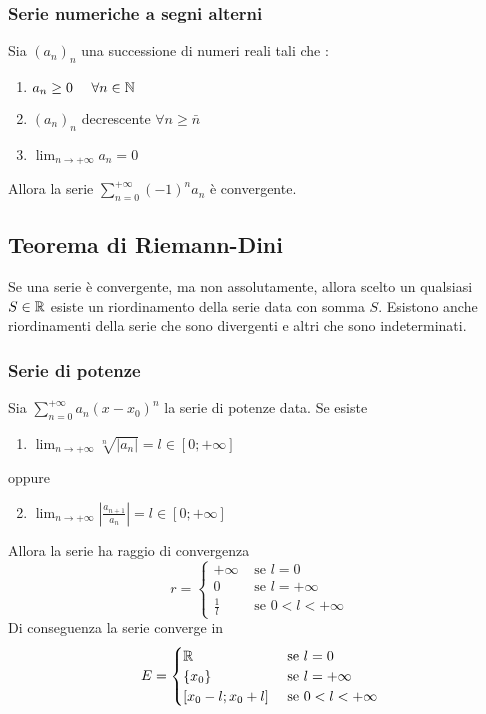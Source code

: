 \documentclass{article}
\newcommand{\se}{\text{ se }}
\begin{document}
\subsubsection*{Serie numeriche a segni alterni}
\begin{shadedTheorem}
    Sia $(a_n)_n$ una successione di numeri reali tali che :
    \begin{enumerate}[label=\roman*\:\textnormal{)},itemindent=*]
        \item $a_n\geq 0 ~~~~\forall n\in \mathbb{N}$
        \item $(a_n)_n$ decrescente $\forall n\geq\bar n$
        \item $\lim_{n\to +\infty} a_n=0$
    \end{enumerate}
    Allora la serie $\sum_{n=0}^{+\infty}(-1)^na_n$ è convergente.
\end{shadedTheorem}
\subsection*{Teorema di Riemann-Dini}
\begin{shadedTheorem}
    Se una serie è convergente, ma non assolutamente, allora scelto un qualsiasi $S\in \mathbb{R}$ esiste un riordinamento della serie data con somma $S$. Esistono anche riordinamenti della serie che sono divergenti e altri che sono indeterminati.
\end{shadedTheorem}
\subsubsection*{Serie di potenze}
\begin{shadedTheorem}
    Sia $\sum_{n=0}^{+\infty}a_n(x-x_0)^n$ la serie di potenze data. Se esiste 
    \begin{enumerate}[label=\roman*\:\textnormal{)},itemindent=*]
        \item $\lim_{n\to+\infty}\sqrt[n]{|a_n|}=l\in [0;+\infty]$
    \end{enumerate}
    oppure
    \begin{enumerate}[label=\roman*\:\textnormal{)},itemindent=*]
        \setcounter{enumi}{1}
        \item $\lim_{n\to+\infty}\left|\frac{a_{n+1}}{a_n}\right|=l\in [0;+\infty]$
    \end{enumerate}
    Allora la serie ha raggio di convergenza
    \[r=\begin{cases}
        +\infty &\se l=0\\
        0&\se l=+\infty\\
        \frac{1}{l}&\se 0<l<+\infty
    \end{cases}\]
    Di conseguenza la serie converge in 
    \[E=\begin{cases}
        \R &\se l=0\\
        \{x_0\}&\se l=+\infty\\
        [x_0-l;x_0+l]&\se 0<l<+\infty
    \end{cases}\]
\end{shadedTheorem}
\end{document}
